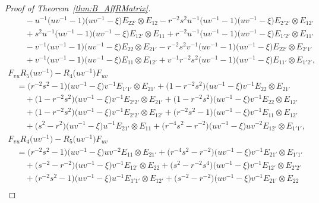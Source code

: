\documentclass[pdftex]{sigma}
\numberwithin{equation}{section}
\begin{document}
\begin{proof}[Proof of Theorem~\ref{thm:B_AffRMatrix}]
\begin{gather*}
\qquad{}- u^{-1}\bigl(uv^{-1} - 1\bigr)\bigl(uv^{-1} - \xi\bigr)E_{22'} \otimes E_{12} -r^{-2}s^{2}u^{-1}\bigl(uv^{-1} -1\bigr)\bigl(uv^{-1} -\xi\bigr)E_{2'2'} \otimes E_{12'} \\
\qquad{}+s^{2}u^{-1}\bigl(uv^{-1} - 1\bigr)\bigl(uv^{-1} - \xi\bigr)E_{12'} \otimes E_{11} + r^{-2}u^{-1}\bigl(uv^{-1} -1\bigr)\bigl(uv^{-1} - \xi\bigr)E_{1'2'} \otimes E_{11'} \\
\qquad{}-v^{-1}\bigl(uv^{-1} - 1\bigr)\bigl(uv^{-1} - \xi\bigr)E_{22} \otimes E_{21'} - r^{-2}s^{2}v^{-1}\bigl(uv^{-1} - 1\bigr)\bigl(uv^{-1} - \xi\bigr)E_{22'} \otimes E_{2'1'} \\
\qquad{}+v^{-1}\bigl(uv^{-1} - 1\bigr)\bigl(uv^{-1} - \xi\bigr)E_{11} \otimes E_{12'} + v^{-1}r^{-2}s^{2}\bigl(uv^{-1} - 1\bigr)\bigl(uv^{-1} - \xi\bigr)E_{11'} \otimes E_{1'2'},
\\
 F_{vu}R_{5}\bigl(uv^{-1}\bigr) - R_{4}\bigl(uv^{-1}\bigr)F_{uv} \\
 \quad{}= \bigl(r^{-2}s^{2} - 1\bigr)\bigl(uv^{-1} - \xi\bigr)v^{-1}E_{1'1'} \otimes E_{21'}+ \bigl(1 - r^{-2}s^{2}\bigr)\bigl(uv^{-1} - \xi\bigr)v^{-1}E_{22} \otimes E_{21'} \\
 \qquad{}+ \bigl(1 - r^{-2}s^{2}\bigr)\bigl(uv^{-1} - \xi\bigr)v^{-1}E_{2'2'} \otimes E_{21'}+ \bigl(1 - r^{-2}s^{2}\bigr)\bigl(uv^{-1} - \xi\bigr)v^{-1}E_{22} \otimes E_{12'}
 \\
 \qquad{}+\bigl(1 - r^{-2}s^{2}\bigr)\bigl(uv^{-1} - \xi\bigr)v^{-1}E_{2'2'} \otimes E_{12'}+ \bigl(r^{-2}s^{2} - 1\bigr)\bigl(uv^{-1} - \xi\bigr)v^{-1}E_{11} \otimes E_{12'}
 \\
 \qquad{}+\bigl(s^{2} - r^{2}\bigr)\bigl(uv^{-1} - \xi\bigr)u^{-1}E_{21'} \otimes E_{11}+ \bigl(r^{-4}s^{2} - r^{-2}\bigr)\bigl(uv^{-1} - \xi\bigr)uv^{-2}E_{12'} \otimes E_{1'1'},
\\
 F_{vu}R_{4}\bigl(uv^{-1}\bigr) - R_{5}\bigl(uv^{-1}\bigr)F_{uv} \\
 \quad{}= \bigl(r^{-2}s^{2} - 1\bigr)\bigl(uv^{-1} - \xi\bigr)uv^{-2}E_{11} \otimes E_{21'} + \bigl(r^{-4}s^{2} - r^{-2}\bigr)\bigl(uv^{-1} - \xi\bigr)v^{-1}E_{21'} \otimes E_{1'1'} \\
 \qquad{}+ \bigl(s^{-2} - r^{-2}\bigr)\bigl(uv^{-1} - \xi\bigr)v^{-1}E_{12'} \otimes E_{22}+\bigl(s^{2} - r^{-2}s^{4}\bigr)\bigl(uv^{-1} - \xi\bigr)v^{-1}E_{12'} \otimes E_{2'2'} \\
 \qquad{}+ \bigl(r^{-2}s^{2} - 1\bigr)\bigl(uv^{-1} - \xi\bigr)u^{-1}E_{1'1'} \otimes E_{12'}+\bigl(s^{-2} - r^{-2}\bigr)\bigl(uv^{-1} - \xi\bigr)v^{-1}E_{21'} \otimes E_{22} \\

\end{gather*}
\end{proof}
\end{document}
